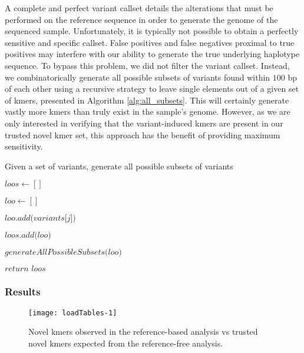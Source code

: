 A complete and perfect variant callset details the alterations that must be performed on the reference sequence in order to generate the genome of the sequenced sample.  Unfortunately, it is typically not possible to obtain a perfectly sensitive and specific callset.  False positives and false negatives proximal to true positives may interfere with our ability to generate the true underlying haplotype sequence.  To bypass this problem, we did not filter the variant callset.  Instead, we combinatorically generate all possible subsets of variants found within $100$ bp of each other using a recursive strategy to leave single elements out of a given set of kmers, presented in Algorithm \ref{alg:all_subsets}.  This will certainly generate vastly more kmers than truly exist in the sample's genome.  However, as we are only interested in verifying that the variant-induced kmers are present in our trusted novel kmer set, this approach has the benefit of providing maximum sensitivity.

\begin{algorithm}
\caption{Given a set of variants, generate all possible subsets of variants}
\label{alg:all_subsets}
\begin{algorithmic}[1]
    \State $\textit{loos} \gets []$

        \State $\textit{loo} \gets []$

                \State $\textit{loo.add(variants[j])}$
            \EndIf
        \EndFor

            \State $\textit{loos.add(loo)}$
        \EndIf

            \State $\textit{generateAllPossibleSubsets(loo)}$
        \EndIf
    \EndFor

    \State $\textit{return loos}$
\EndFunction
\end{algorithmic}
\end{algorithm}

\subsubsection{Results}

\begin{figure}[h!]
  \centering
    \texttt{[image: loadTables-1]}
  \caption{Novel kmers observed in the reference-based analysis vs trusted novel kmers expected from the reference-free analysis.}
  \label{fig:obs_vs_exp_kmers}
\end{figure}


